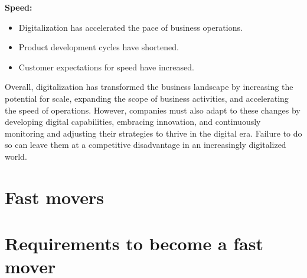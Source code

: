 \documentclass[a4]{scrartcl}
\begin{document}
	
	\textbf{Speed:}
	\begin{itemize}
		\item Digitalization has accelerated the pace of business operations.
		\item Product development cycles have shortened.
		\item Customer expectations for speed have increased.
	\end{itemize}
	
	Overall, digitalization has transformed the business landscape by increasing the potential for scale, expanding the scope of business activities, and accelerating the speed of operations. However, companies must also adapt to these changes by developing digital capabilities, embracing innovation, and continuously monitoring and adjusting their strategies to thrive in the digital era. Failure to do so can leave them at a competitive disadvantage in an increasingly digitalized world.
	
	
	
	
	
	
	
	
	
	\section{Fast movers}
	
	
	
	
	
	
	
	
	
	
	
	
	
	\section{Requirements to become a fast mover}
	
	
	
	\cite{digitalmatrix}
	\cite{leadingdigital}
	\cite{wiwi}
	
	
	
	
	
	\printbibliography
	
	
	
	
	
	
\end{document}

